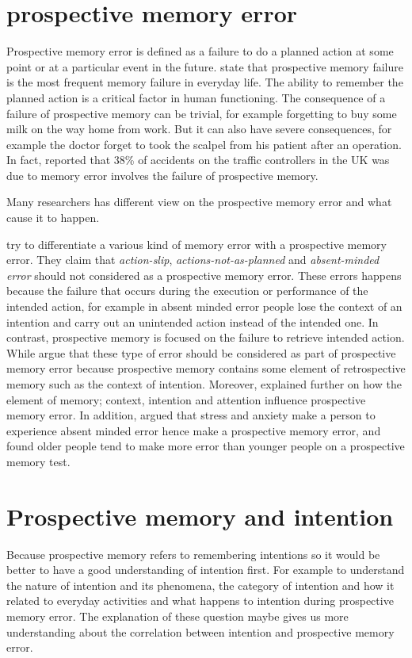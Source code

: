 \section{prospective memory error}

Prospective memory error is defined as a failure to do a planned action at some point or at a particular event in the future.
\cite{Kliegel1984} state that prospective memory failure is the most frequent memory failure in everyday life.
The ability to remember the planned action is a critical factor in human functioning. The consequence of a failure of prospective memory can be trivial, for example forgetting to buy some milk on the way home from work.
But it can also have severe consequences, for example the doctor forget to took the scalpel from his patient after an operation.
In fact, \cite{Shorrock2005} reported that 38\% of accidents on the traffic controllers in the UK was due to memory error involves the failure of prospective memory.

Many researchers has different view on the prospective memory error and what cause it to happen.

\cite{LiaKvavilashviliAndJudiEllis} try to differentiate a various kind of memory error with a prospective memory error. They claim that \textit{action-slip}\citep{HeckhausenHeinz1990IAaA},
 \textit{actions-not-as-planned} \citep{Reason1979-REAANA-2} and \textit{absent-minded error} \citep{cohen2008memory} should not considered as a prospective memory error. These errors happens because the failure that occurs during the execution or performance of the intended action, for example in absent minded error people lose the context of an intention and carry out an unintended action instead of the intended one. In contrast, prospective memory is focused on the failure to retrieve intended action.
While \cite{10.1371/journal.pone.0074447} argue that these type of error should be considered as part of prospective memory error because prospective memory contains some element of retrospective memory such as the context of intention. Moreover, \cite{Reason1984} explained further on how the element of memory; context, intention and attention influence prospective memory error.  In addition, \cite{Cockburn1994} argued that stress and anxiety make a person to experience absent minded error hence make a
prospective memory error, and \cite{Scullin2012} found older people tend to make more error than younger people on a prospective memory test.

\section{Prospective memory and intention}
Because prospective memory refers to remembering intentions so it would be better to have a good understanding of intention first. For example to understand the nature of intention and its
phenomena, the category of intention and how it related to everyday activities and what happens to intention during prospective memory error. The explanation of these question maybe gives us more understanding about the correlation between intention and prospective memory error.

